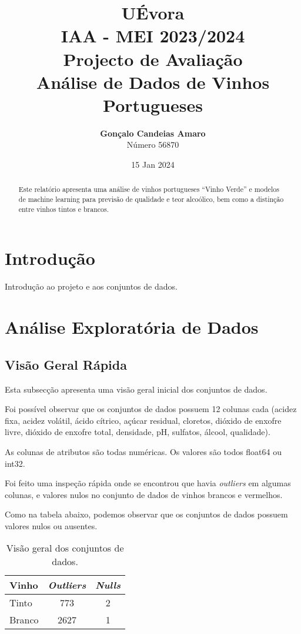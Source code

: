 \documentclass{article}
\title{UÉvora\\IAA - MEI 2023/2024\\Projecto de Avaliação\\\textbf{Análise de Dados de Vinhos Portugueses}}
\author{\textbf{Gonçalo Candeias Amaro}\\Número 56870}
\date{15 Jan 2024}
\begin{document}
    \maketitle

    \begin{abstract}
        Este relatório apresenta uma análise de vinhos portugueses ``Vinho Verde'' e modelos de machine learning para previsão de qualidade e teor alcoólico, bem como a distinção entre vinhos tintos e brancos.
    \end{abstract}


    \section{Introdução}
    Introdução ao projeto e aos conjuntos de dados.


    \section{Análise Exploratória de Dados}

    \subsection{Visão Geral Rápida}
    Esta subsecção apresenta uma visão geral inicial dos conjuntos de dados.

    Foi possível observar que os conjuntos de dados possuem 12 colunas cada (acidez fixa, acidez volátil, ácido cítrico, açúcar residual, cloretos, dióxido de enxofre livre, dióxido de enxofre total, densidade, pH, sulfatos, álcool, qualidade).

    As colunas de atributos são todas numéricas. Os valores são todos float64 ou int32.

    Foi feito uma inspeção rápida onde se encontrou que havia \textit{outliers} em algumas colunas, e valores nulos no conjunto de dados de vinhos brancos e vermelhos.

    Como na tabela abaixo, podemos observar que os conjuntos de dados possuem valores nulos ou ausentes.

    \begin{table}[ht]
        \centering
        \begin{tabular}{@{}lcc@{}}
            \toprule
            Vinho  & \textit{Outliers} & \textit{Nulls} \\
            \midrule
            Tinto  & 773               & 2              \\
            Branco & 2627              & 1              \\
            \bottomrule
        \end{tabular}
        \caption{Visão geral dos conjuntos de dados.}
        \label{tab:dataset_overview}
    \end{table}
\end{document}
